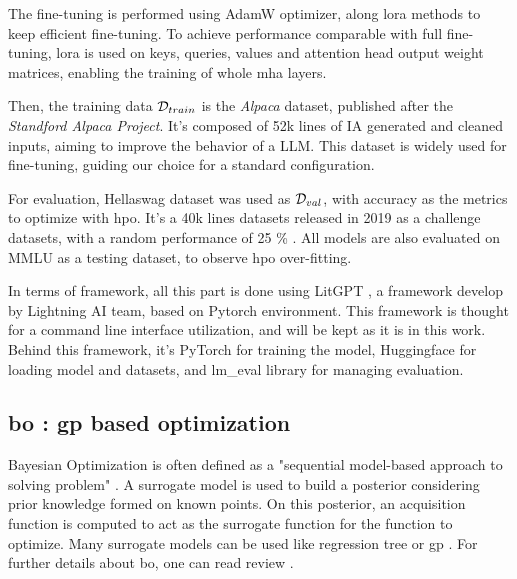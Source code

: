 The fine-tuning is performed using AdamW \cite{loshchilov_decoupled_2019} optimizer, along \acrshort{lora} methods to keep efficient fine-tuning. To achieve performance comparable with full fine-tuning, \acrshort{lora} is used on keys, queries, values and attention head output weight matrices, enabling the training of whole \acrfull{mha} layers. 

Then, the training data $\mathcal{D}_{train}$ is the \textit{Alpaca} dataset, published after the \textit{Standford Alpaca Project}. It's composed of 52k lines of IA generated and cleaned inputs, aiming to improve the behavior of a LLM. This dataset is widely used \cite{dettmers_qlora_2023,chung_scaling_2024,zhou_lima_2023} for fine-tuning, guiding our choice for a standard configuration. 

For evaluation, Hellaswag \cite{zellers_hellaswag_2019} dataset was used as $\mathcal{D}_{val}$, with accuracy as the metrics to optimize with \acrshort{hpo}. It's a 40k lines datasets released in 2019 as a challenge datasets, with a random performance of 25 \% . All models are also evaluated on MMLU \cite{hendryckstest2021} as a testing dataset, to observe \acrshort{hpo} over-fitting. 

In terms of framework, all this part is done using LitGPT \cite{the_lightning_ai_team_litgpt_2023}, a framework develop by Lightning AI team, based on Pytorch  \cite{ansel_pytorch_2024} environment. This framework is thought for a command line interface utilization, and will be kept as it is in this work. Behind this framework, it's PyTorch for training the model, Huggingface for loading model and datasets, and lm\_eval library for managing evaluation.

\subsection{\acrfull{bo} : \acrfull{gp} based optimization}
\label{sec:bo}

Bayesian Optimization is often defined as a "sequential model-based approach to solving problem" \cite{shahriari_taking_2016}. A surrogate model is used to build a posterior considering prior knowledge formed on known points. On this posterior, an acquisition function is computed to act as the surrogate function for the function to optimize. Many surrogate models can be used like regression tree \cite{ammari_linear_2023} or \acrfull{gp} \cite{rajaram_empirical_2021}. For further details about \acrshort{bo}, one can read review \cite{shahriari_taking_2016}.

